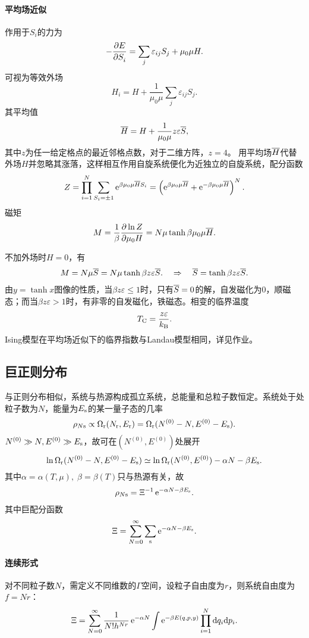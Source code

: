 \paragraph*{平均场近似}作用于$S_i$的力为 
\[
	-\frac{\partial^{\;\!\!}E}{\partial S_i^{\;\!\!}}=\sum_j\varepsilon_{ij}S_j+\mu_0\mu H.
\]
可视为等效外场
\[
	H_i=H+\frac1{\mu_0\mu}\sum_j\varepsilon_{ij}S_j.
\]
其平均值
\[
	\overline H=H+\frac1{\mu_0\mu}z\varepsilon\overline S,
\]
其中$z$为任一给定格点的最近邻格点数，对于二维方阵，$z=4$。
\clearpage
用平均场$\overline H$代替外场$H$并忽略其涨落，这样相互作用自旋系统便化为近独立的自旋系统，配分函数
\[
	Z=\prod_{i=1}^N\sum_{S_i=\pm 1}\mathop{}\!\mathrm{e}^{\beta\mu_0\mu\overline H S_i}=\left(\mathop{}\!\mathrm{e}^{\beta\mu_0\mu\overline H}+\mathop{}\!\mathrm{e}^{-\beta\mu_0\mu\overline H}\right)^N.
\]
磁矩
\begin{align}
	M=\frac1\beta\frac{\partial^{\;\!\!}\ln Z}{\partial \mu_0 H^{\;\!\!}}=N\mu\tanh\beta\mu_0\mu\overline H.
\end{align}

不加外场时$H=0$，有
\begin{align}
	M=N\mu\overline S=N\mu\tanh\beta z\varepsilon\overline S.\quad\Rightarrow\quad\overline S=\tanh\beta z\varepsilon\overline S.
\end{align}
由$y=\tanh x$图像的性质，当$\beta z\varepsilon\leqslant 1$时，只有$\overline S=0$的解，自发磁化为0，顺磁态；而当$\beta z\varepsilon>1$时，有非零的自发磁化，铁磁态。相变的临界温度
\begin{align}
	T_\mathrm C=\frac{z\varepsilon}{k_{\mathrm B}}.
\end{align}
Ising模型在平均场近似下的临界指数与Landau模型相同，详见作业。
\subsection{巨正则分布}

与正则分布相似，系统与热源构成孤立系统，总能量和总粒子数恒定。系统处于处粒子数为$N$，能量为$E_\mathrm s$的某一量子态的几率
\[
	\rho_{N\mathrm s}\propto\Omega_\mathrm r(N_\mathrm r,E_\mathrm r)=\Omega_\mathrm r(N^{(0)}-N,E^{(0)}-E_\mathrm s).
\]
$N^{(0)}\gg N,E^{(0)}\gg E_\mathrm s$，故可在$(N^{(0)},E^{(0)})$处展开
\[
	\ln\Omega_\mathrm r(N^{(0)}-N,E^{(0)}-E_\mathrm s)\simeq\ln\Omega_\mathrm r(N^{(0)},E^{(0)})-\alpha N-\beta E_\mathrm s.
\]
其中$\alpha=\alpha(T,\mu),\;\beta=\beta(T)$只与热源有关，故
\begin{align}
	\rho_{N\mathrm s}=\Xi^{-1}\mathop{}\!\mathrm{e}^{-\alpha N-\beta E_\mathrm s}.
\end{align}
其中巨配分函数
\begin{align}
	\Xi=\sum_{N=0}^\infty\sum_\mathrm s\mathop{}\!\mathrm{e}^{-\alpha N-\beta E_\mathrm s}.
\end{align}
\paragraph*{连续形式}对不同粒子数$N$，需定义不同维数的$\Gamma$空间，设粒子自由度为$r$，则系统自由度为$f=Nr$：
\begin{align}
	\Xi=\sum_{N=0}^\infty\frac1{N!h^{Nr}}\mathop{}\!\mathrm{e}^{-\alpha N}\int\mathop{}\!\mathrm{e}^{-\beta E(q,p,y)}\prod_{i=1}^N\mathop{}\!\mathrm{d} q_i\mathrm{d} p_i.
\end{align}
